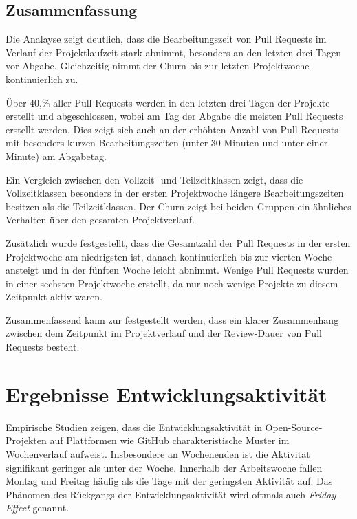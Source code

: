 \newpage

\subsection{Zusammenfassung}
Die Analayse zeigt deutlich, dass die Bearbeitungszeit von Pull Requests im Verlauf der Projektlaufzeit stark abnimmt, besonders an den letzten drei Tagen vor Abgabe. Gleichzeitig nimmt der Churn bis zur letzten Projektwoche kontinuierlich zu.

Über 40,\% aller Pull Requests werden in den letzten drei Tagen der Projekte erstellt und abgeschlossen, wobei am Tag der Abgabe die meisten Pull Requests erstellt werden. Dies zeigt sich auch an der erhöhten Anzahl von Pull Requests mit besonders kurzen Bearbeitungszeiten (unter 30 Minuten und unter einer Minute) am Abgabetag.

Ein Vergleich zwischen den Vollzeit- und Teilzeitklassen zeigt, dass die Vollzeitklassen besonders in der ersten Projektwoche längere Bearbeitungszeiten besitzen als die Teilzeitklassen. Der Churn zeigt bei beiden Gruppen ein ähnliches Verhalten über den gesamten Projektverlauf.

Zusätzlich wurde festgestellt, dass die Gesamtzahl der Pull Requests in der ersten Projektwoche am niedrigsten ist, danach kontinuierlich bis zur vierten Woche ansteigt und in der fünften Woche leicht abnimmt. Wenige Pull Requests wurden in einer sechsten Projektwoche erstellt, da nur noch wenige Projekte zu diesem Zeitpunkt aktiv waren.

Zusammenfassend kann zur  festgestellt werden, dass ein klarer Zusammenhang zwischen dem Zeitpunkt im Projektverlauf und der Review-Dauer von Pull Requests besteht.

\section{Ergebnisse Entwicklungsaktivität}
\label{sec:ErgebnisseEntwicklungsaktivtät}
Empirische Studien zeigen, dass die Entwicklungsaktivität in Open-Source-Projekten auf Plattformen wie GitHub charakteristische Muster im Wochenverlauf aufweist. Insbesondere an Wochenenden ist die Aktivität signifikant geringer als unter der Woche. Innerhalb der Arbeitswoche fallen Montag und Freitag häufig als die Tage mit der geringsten Aktivität auf. Das Phänomen des Rückgangs der Entwicklungsaktivität wird oftmals auch \textit{Friday Effect} genannt. \parencite{claes_programmers_2018}

